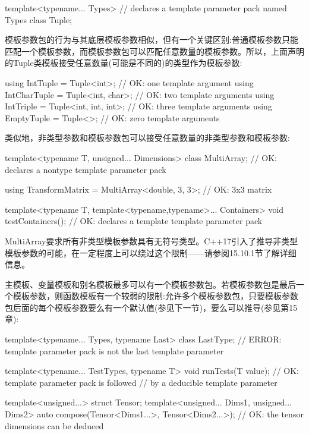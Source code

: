 \begin{cpp}
template<typename... Types> // declares a template parameter pack named Types
class Tuple;
\end{cpp}

模板参数包的行为与其底层模板参数相似，但有一个关键区别:普通模板参数只能匹配一个模板参数，而模板参数包可以匹配任意数量的模板参数。所以，上面声明的Tuple类模板接受任意数量(可能是不同的)的类型作为模板参数:

\begin{cpp}
using IntTuple = Tuple<int>; // OK: one template argument
using IntCharTuple = Tuple<int, char>; // OK: two template arguments
using IntTriple = Tuple<int, int, int>; // OK: three template arguments
using EmptyTuple = Tuple<>; // OK: zero template arguments
\end{cpp}

类似地，非类型参数和模板参数包可以接受任意数量的非类型参数和模板参数:

\begin{cpp}
template<typename T, unsigned... Dimensions>
class MultiArray; // OK: declares a nontype template parameter pack

using TransformMatrix = MultiArray<double, 3, 3>; // OK: 3x3 matrix

template<typename T, template<typename,typename>... Containers>
void testContainers(); // OK: declares a template template parameter pack
\end{cpp}

MultiArray要求所有非类型模板参数具有无符号类型。C++17引入了推导非类型模板参数的可能，在一定程度上可以绕过这个限制——请参阅15.10.1节了解详细信息。

主模板、变量模板和别名模板最多可以有一个模板参数包。若模板参数包是最后一个模板参数，则函数模板有一个较弱的限制:允许多个模板参数包，只要模板参数包后面的每个模板参数要么有一个默认值(参见下一节)，要么可以推导(参见第15章):

\begin{cpp}
template<typename... Types, typename Last>
class LastType; // ERROR: template parameter pack is not the last template parameter

template<typename... TestTypes, typename T>
void runTests(T value); // OK: template parameter pack is followed
// by a deducible template parameter

template<unsigned...> struct Tensor;
template<unsigned... Dims1, unsigned... Dims2>
auto compose(Tensor<Dims1...>, Tensor<Dims2...>);
// OK: the tensor dimensions can be deduced
\end{cpp}

